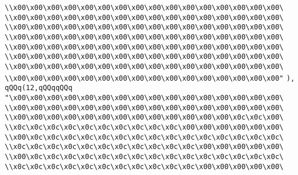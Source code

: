 \verb|\\x00\x00\x00\x00\x00\x00\x00\x00\x00\x00\x00\x00\x00\x00\x00\x00\|\newline
\verb|\\x00\x00\x00\x00\x00\x00\x00\x00\x00\x00\x00\x00\x00\x00\x00\x00\|\newline
\verb|\\x00\x00\x00\x00\x00\x00\x00\x00\x00\x00\x00\x00\x00\x00\x00\x00\|\newline
\verb|\\x00\x00\x00\x00\x00\x00\x00\x00\x00\x00\x00\x00\x00\x00\x00\x00\|\newline
\verb|\\x00\x00\x00\x00\x00\x00\x00\x00\x00\x00\x00\x00\x00\x00\x00\x00\|\newline
\verb|\\x00\x00\x00\x00\x00\x00\x00\x00\x00\x00\x00\x00\x00\x00\x00\x00\|\newline
\verb|\\x00\x00\x00\x00\x00\x00\x00\x00\x00\x00\x00\x00\x00\x00\x00\x00\|\newline
\verb|\\x00\x00\x00\x00\x00\x00\x00\x00\x00\x00\x00\x00\x00\x00\x00\x00"|\newline
\verb|),|\newline
\verb|qQQq(12,qQQqqQQq|\newline
\verb|"\x00\x00\x00\x00\x00\x00\x00\x00\x00\x00\x00\x00\x00\x00\x00\x00\|\newline
\verb|\\x00\x00\x00\x00\x00\x00\x00\x00\x00\x00\x00\x00\x00\x00\x00\x00\|\newline
\verb|\\x00\x00\x00\x00\x00\x00\x00\x00\x00\x00\x00\x00\x00\x0c\x0c\x00\|\newline
\verb|\\x0c\x0c\x0c\x0c\x0c\x0c\x0c\x0c\x0c\x0c\x00\x00\x00\x00\x00\x00\|\newline
\verb|\\x00\x0c\x0c\x0c\x0c\x0c\x0c\x0c\x0c\x0c\x0c\x0c\x0c\x0c\x0c\x0c\|\newline
\verb|\\x0c\x0c\x0c\x0c\x0c\x0c\x0c\x0c\x0c\x0c\x0c\x00\x00\x00\x00\x00\|\newline
\verb|\\x00\x0c\x0c\x0c\x0c\x0c\x0c\x0c\x0c\x0c\x0c\x0c\x0c\x0c\x0c\x0c\|\newline
\verb|\\x0c\x0c\x0c\x0c\x0c\x0c\x0c\x0c\x0c\x0c\x0c\x00\x00\x00\x00\x00\|\newline
